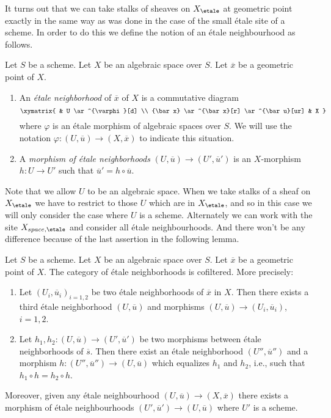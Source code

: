 \noindent
It turns out that we can take stalks of sheaves on $X_\etale$
at geometric point exactly in the same way as was done in the
case of the small \'etale site of a scheme. In order to do this we
define the notion of an \'etale neighbourhood as follows.

\begin{definition}
\label{definition-etale-neighbourhood}
Let $S$ be a scheme. Let $X$ be an algebraic space over $S$.
Let $\overline{x}$ be a geometric point of $X$.
\begin{enumerate}
\item An {\it \'etale neighborhood} of $\overline{x}$
of $X$ is a commutative diagram
$$
\xymatrix{
& U \ar^{\varphi}[d] \\
{\bar x} \ar^{\bar x}[r] \ar^{\bar u}[ur] & X
}
$$
where $\varphi$ is an \'etale morphism of algebraic spaces over $S$.
We will use the notation $\varphi : (U, \overline{u}) \to (X, \overline{x})$
to indicate this situation.
\item A {\it morphism of \'etale neighborhoods}
$(U, \overline{u}) \to (U', \overline{u}')$
is an $X$-morphism $h : U \to U'$
such that $\overline{u}' = h \circ \overline{u}$.
\end{enumerate}
\end{definition}

\noindent
Note that we allow $U$ to be an algebraic space. When we take stalks
of a sheaf on $X_\etale$ we have to restrict to those $U$ which
are in $X_\etale$, and so in this case we will only consider the case
where $U$ is a scheme. Alternately we can work with the site
$X_{space, \etale}$ and consider all \'etale neighbourhoods. And there
won't be any difference because of the last assertion in the following lemma.

\begin{lemma}
\label{lemma-cofinal-etale}
Let $S$ be a scheme. Let $X$ be an algebraic space over $S$.
Let $\overline{x}$ be a geometric point of $X$.
The category of \'etale neighborhoods is cofiltered. More precisely:
\begin{enumerate}
\item Let $(U_i, \overline{u}_i)_{i = 1, 2}$ be two \'etale neighborhoods of
$\overline{x}$ in $X$. Then there exists a third \'etale neighborhood
$(U, \overline{u})$ and morphisms
$(U, \overline{u}) \to (U_i, \overline{u}_i)$, $i = 1, 2$.
\item Let $h_1, h_2: (U, \overline{u}) \to (U', \overline{u}')$ be two
morphisms between \'etale neighborhoods of $\overline{s}$. Then there exist an
\'etale neighborhood $(U'', \overline{u}'')$ and a morphism
$h : (U'', \overline{u}'') \to (U, \overline{u})$
which equalizes $h_1$ and $h_2$, i.e., such that
$h_1 \circ h = h_2 \circ h$.		
\end{enumerate}
Moreover, given any \'etale neighbourhood
$(U, \overline{u}) \to (X, \overline{x})$
there exists a morphism of \'etale neighbourhoods
$(U', \overline{u}') \to (U, \overline{u})$
where $U'$ is a scheme.
\end{lemma}

